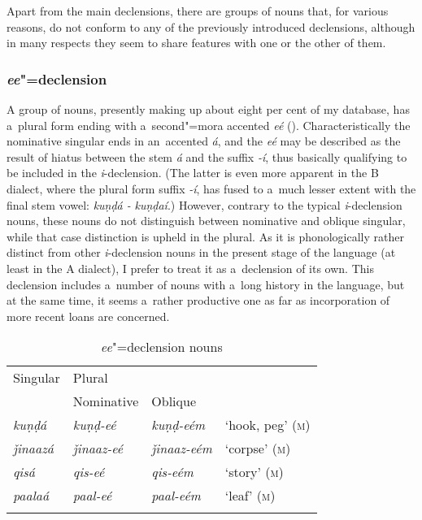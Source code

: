 Apart from the main declensions, there are groups of nouns that, for various reasons, do not conform to any of the previously introduced declensions, although in many respects they seem to share features with one or the other of them.

\subsubsection*{\textit{ee}"=declension}

A group of nouns, presently making up about eight per cent of my database, has a~plural form ending with a~second"=mora accented \textit{eé} (). Characteristically the nominative singular ends in an~accented \textit{á}, and the \textit{eé} may be described as the result of hiatus between the stem \textit{á} and the suffix \textit{-í}, thus basically qualifying to be included in the \textit{i}-declension. (The latter is even more apparent in the B dialect, where the plural form suffix \textit{-í}, has fused to a~much lesser extent with the final stem vowel: \textit{kuṇḍá -} \textit{kuṇḍaí}.) However, contrary to the typical \textit{i}-declension nouns, these nouns do not distinguish between nominative and oblique singular, while that case distinction is upheld in the plural. As it is phonologically rather distinct from other \textit{i}-declension nouns in the present stage of the language (at least in the A dialect), I prefer to treat it as a~declension of its own. This declension includes a~number of nouns with a~long history in the language, but at the same time, it seems a~rather productive one as far as incorporation of more recent loans are concerned.


\begin{table}[ht]
 \label{bkm:Ref193698864}
 \caption{\textit{ee}"=declension nouns}
\begin{tabularx}{\textwidth}{ Q Q Q Q }
\lsptoprule
Singular
&
Plural\\
&
Nominative &
Oblique &
\\\hline
\textit{kuṇḍá} &
\textit{kuṇḍ-eé} &
\textit{kuṇḍ-eém} &
`hook, peg' (\textsc{m})\\
\textit{ǰinaazá} &
\textit{ǰinaaz-eé} &
\textit{ǰinaaz-eém} &
`corpse' (\textsc{m})\\
\textit{qisá} &
\textit{qis-eé} &
\textit{qis-eém} &
`story' (\textsc{m})\\
\textit{paalaá} &
\textit{paal-eé} &
\textit{paal-eém} &
`leaf' (\textsc{m})\\\lspbottomrule
\end{tabularx}
\label{tab:4-18}
\end{table}


